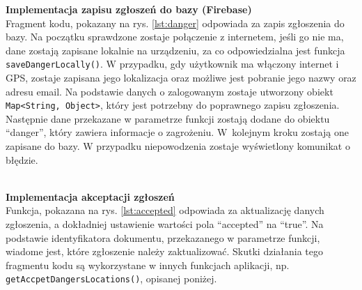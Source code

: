 \noindent
\textbf{Implementacja zapisu zgłoszeń do bazy (Firebase)} \\ 
\indent Fragment kodu, pokazany na rys. \ref{lst:danger} odpowiada za zapis zgłoszenia do bazy. Na początku sprawdzone zostaje połączenie z internetem, jeśli go nie ma, dane zostają zapisane lokalnie na urządzeniu, za co odpowiedzialna jest funkcja \verb|saveDangerLocally()|. W przypadku, gdy użytkownik ma włączony internet i GPS, zostaje zapisana jego lokalizacja oraz możliwe jest pobranie jego nazwy oraz adresu email. Na podstawie danych o zalogowanym zostaje utworzony obiekt  \verb|Map<String, Object>|, który jest potrzebny do poprawnego zapisu zgłoszenia. Następnie dane przekazane w parametrze funkcji zostają dodane do obiektu “danger”, który zawiera informacje o zagrożeniu. W~kolejnym kroku zostają one zapisane do bazy. W przypadku niepowodzenia zostaje wyświetlony komunikat o błędzie. \\

\noindent
\setlength{\fboxrule}{0.5pt}
\begin{minipage}{\linewidth}
    \label{lst:danger}
    \centering
\end{minipage}
\\

\noindent
\textbf{Implementacja akceptacji zgłoszeń} \\ 
\indent Funkcja, pokazana na rys. \ref{lst:accepted} odpowiada za aktualizację danych zgłoszenia, a dokładniej ustawienie wartości pola “accepted” na “true”. Na podstawie identyfikatora dokumentu, przekazanego w parametrze funkcji, wiadome jest, które zgłoszenie należy zaktualizować. Skutki działania tego fragmentu kodu są wykorzystane w innych funkcjach aplikacji, np. \verb|getAccpetDangersLocations()|, opisanej poniżej.

